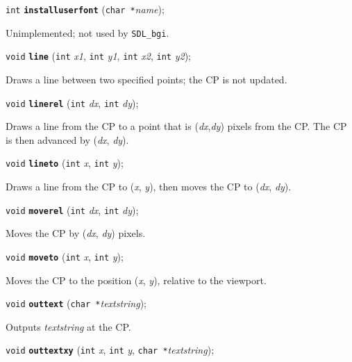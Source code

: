 \documentclass[a4paper,11pt]{article}
\newcommand{\SDLbgi}{\texttt{SDL\_bgi}}
\newcommand{\V}{\texttt{void}}      %
\newcommand{\I}{\texttt{int}}       %
\newcommand{\C}{\texttt{char *}}    %
\newcommand{\func}[1]{\textbf{\texttt{#1}}}  %
\newcommand{\A}[1]{\emph{#1}}       %
\newenvironment{bgi}
{ %
  \begin{snugshade}
}
{ %
  \end{snugshade}
}
\begin{document}

\begin{bgi}
\I{} \func{installuserfont} (\C{}\A{name}); 
\end{bgi}

Unimplemented; not used by \SDLbgi.


\begin{bgi}
\V{} \func{line} (\I{} \A{x1}, \I{} \A{y1}, \I{} \A{x2}, \I{} \A{y2});
\end{bgi}

Draws a line between two specified points; the CP is not updated.


\begin{bgi}
\V{} \func{linerel} (\I{} \A{dx}, \I{} \A{dy});
\end{bgi}

Draws a line from the CP to a point that is (\A{dx},\A{dy}) pixels
from the CP. The CP is then advanced by (\A{dx}, \A{dy}).


\begin{bgi}
\V{} \func{lineto} (\I{} \A{x}, \I{} \A{y});
\end{bgi}

Draws a line from the CP to (\A{x}, \A{y}), then moves the CP to
(\A{dx}, \A{dy}).


\begin{bgi}
\V{} \func{moverel} (\I{} \A{dx}, \I{} \A{dy});
\end{bgi}

Moves the CP by (\A{dx}, \A{dy}) pixels.


\begin{bgi}
\V{} \func{moveto} (\I{} \A{x}, \I{} \A{y});
\end{bgi}

Moves the CP to the position (\A{x}, \A{y}), relative to the
viewport.


\begin{bgi}
\V{} \func{outtext} (\C{}\A{textstring});
\end{bgi}

Outputs \A{textstring} at the CP.


\begin{bgi}
\V{} \func{outtextxy} (\I{} \A{x}, \I{} \A{y}, \C{}\A{textstring});
\end{bgi}
\end{document}
